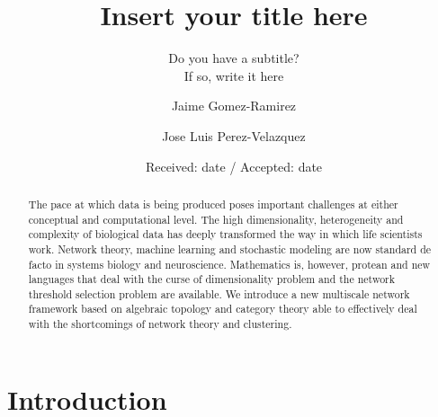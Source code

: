 \documentclass[onecollarge,runningheads]{svjour2}
\begin{document}
\title{Insert your title here%
}
\subtitle{Do you have a subtitle?\\ If so, write it here}
\author{Jaime Gomez-Ramirez        \and
        Jose Luis Perez-Velazquez %
}
\date{Received: date / Accepted: date}
\maketitle

\begin{abstract}
The pace at which data is being produced poses important challenges at either conceptual and computational level. The high dimensionality, heterogeneity and complexity of biological data has deeply transformed the way in which life scientists work. Network theory, machine learning and stochastic modeling are now standard de facto in systems biology and neuroscience. Mathematics is, however, protean and new languages that deal with the curse of dimensionality problem and the network threshold selection problem are available. We introduce a new multiscale network framework based on algebraic topology and category theory able to effectively deal with the shortcomings of network theory and clustering.

\end{abstract}

\section{Introduction}
\end{document}
